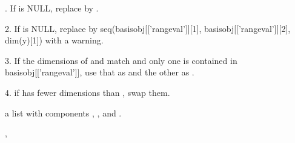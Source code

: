 \documentclass{article}
\begin{document}
\begin{Details}.  If  is NULL, replace by .

2.  If  is NULL, replace by
seq(basisobj[['rangeval']][1], basisobj[['rangeval']][2], dim(y)[1])
with a warning.  

3.  If the dimensions of  and  match and only
one is contained in basisobj[['rangeval']], use that as 
and the other as .

4.  if  has fewer dimensions than , swap them.
\end{Details}
\begin{Value}
a list with components , , and .
\end{Value}
\begin{SeeAlso}\relax
{} 
, 
\end{SeeAlso}
\end{document}
